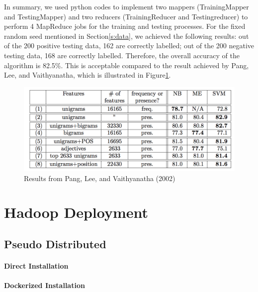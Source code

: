  In summary, we used python codes to implement two mappers 
 (TrainingMapper and TestingMapper) and two reducers (TrainingReducer 
 and Testingreducer) to perform 4 MapReduce jobs for the training and 
 testing processes. For the fixed random seed mentioned in 
 Section\ref{s:data}, we achieved the following results: out of the 200 
 positive testing data, 162 are correctly labelled; out of the 200 negative 
 testing data, 168 are correctly labelled. Therefore, the
 overall accuracy of the algorithm is 82.5\%. This is acceptable 
 compared to the result achieved by Pang, Lee, and Vaithyanatha, which is 
 illustrated in Figure\ref{f:pang-result}. 
% 

\begin{figure}[!ht]
	\centering\includegraphics[width=\columnwidth]{images/pang-result.png}
        \caption{Results
	from Pang, Lee, and Vaithyanatha
	(2002)~\cite{hid-sp18-405-sentiment-pang2002thumbs}}\label{f:pang-result}
\end{figure}


\section{Hadoop Deployment}\label{s:hadoopdep}

\subsection{Pseudo Distributed}
\paragraph{Direct Installation}
\paragraph{Dockerized Installation}

